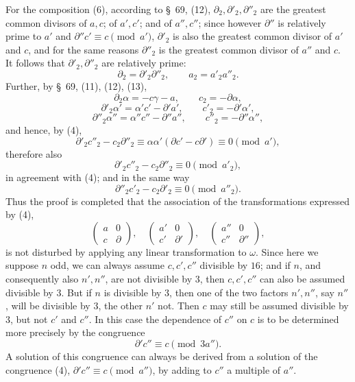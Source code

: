 \documentclass[11pt]{article}
\begin{document}
For the composition (6), according to \S~69, (12), $\partial_2,\partial'_2,\partial''_2$ are the greatest common divisors of $a,c$; of $a',c'$; and of $a'',c''$; since however $\partial''$ is relatively prime to $a'$ and $\partial''c'\equiv c\pmod {a'}$, $\partial'_2$ is also the greatest common divisor of $a'$ and $c$, and for the same reasons $\partial''_2$ is the greatest common divisor of $a''$ and $c$. It follows that $\partial'_2,\partial''_2$ are relatively prime:
\[
 \partial_2=\partial'_2\partial''_2,
 \qquad a_2=a'_2a''_2.
\]
Further, by \S~69, (11), (12), (13),
\[
 \partial_2\alpha=-c\gamma-a,
 \qquad c_2=-\partial\alpha,
\]
\[
 \partial'_2\alpha'=\alpha'c'-\partial' a',
 \qquad c'_2=-\partial'\alpha',
\]
\[
 \partial''_2\alpha''=\alpha''c''-\partial''a'',
 \qquad c''_2=-\partial''\alpha'',
\]
and hence, by (4),
\[
 \partial'_2c''_2-c_2\partial''_2\equiv \alpha\alpha'(\partial c'-c\partial')\equiv0\pmod {a'},
\]
therefore also
\[
 \partial'_2c''_2-c_2\partial''_2\equiv0\pmod {a'_2},
\]
in agreement with (4); and in the same way
\[
 \partial''_2c'_2-c_2\partial'_2\equiv0\pmod {a''_2}.
\]
Thus the proof is completed that the association of the transformations expressed by (4),
\[
 \begin{pmatrix}a&0\\ c&\partial\end{pmatrix},
 \quad
 \begin{pmatrix}a'&0\\ c'&\partial'\end{pmatrix},
 \quad
 \begin{pmatrix}a''&0\\ c''&\partial''\end{pmatrix},
\]
is not disturbed by applying any linear transformation to $\omega$. Since here we suppose $n$ odd, we can always assume $c,c',c''$ divisible by $16$; and if $n$, and consequently also $n',n''$, are not divisible by $3$, then $c,c',c''$ can also be assumed divisible by $3$. But if $n$ is divisible by $3$, then one of the two factors $n',n''$, say $n''$, will be divisible by $3$, the other $n'$ not. Then $c$ may still be assumed divisible by $3$, but not $c'$ and $c''$. In this case the dependence of $c''$ on $c$ is to be determined more precisely by the congruence
\begin{equation}
 \partial'c''\equiv c\pmod {3a''}.
\tag{7}
\end{equation}
A solution of this congruence can always be derived from a solution of the congruence (4), $\partial'c''\equiv c\pmod {a''}$, by adding to $c''$ a multiple of $a''$.
\end{document}
